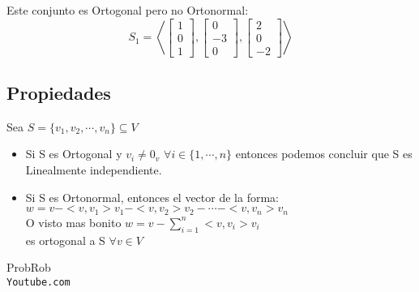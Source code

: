 \documentclass[12pt]{report}                                %
\begin{document}
        Este conjunto es Ortogonal pero no Ortonormal:
        \begin{equation*}
            S_1 = \left< \begin{bmatrix} 1\\0\\1\end{bmatrix} , \begin{bmatrix} 0\\-3\\0\end{bmatrix}, \begin{bmatrix} 2\\0\\-2\end{bmatrix} \right> 
        \end{equation*}


        \subsection{Propiedades}
        Sea $S = \{ v_1 , v_2 , \cdots, v_n \} \subseteq V$

        \begin{itemize}
            \item Si S es Ortogonal y $v_i \neq 0_v$ $\forall i \in \{1, \cdots, n\}$
            entonces podemos concluir que S es Linealmente independiente.

            \item Si S es Ortonormal, entonces el vector de la forma:\\
            $ w = v - <v, v_1> v_1 - <v, v_2> v_2 - \cdots - <v, v_n> v_n $\\
            O visto mas bonito $w = v - \sum_{i = 1}^{n} <v, v_i>v_i$\\
            es ortogonal a S $\forall v \in V$
        \end{itemize}



\clearpage

    \begin{thebibliography}{9}

        ProbRob
        \\\texttt{Youtube.com}


     

\end{thebibliography}
\end{document}
